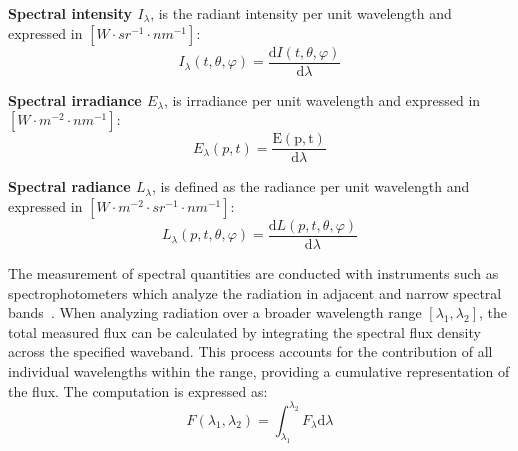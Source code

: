 \textbf{Spectral intensity $I_\lambda$}, is the radiant intensity per unit wavelength and expressed in $[W \cdot {sr}^{-1} \cdot {nm}^{-1}]$:
\begin{equation}
    I_\lambda(t, \theta, \varphi)  =  \frac{\mathrm{d}I(t, \theta, \varphi)}{\mathrm{d}\lambda}
\end{equation}

\textbf{Spectral irradiance $E_\lambda$}, is irradiance per unit wavelength and expressed in $[W \cdot m^{-2} \cdot {nm}^{-1}]$:
\begin{equation}
    E_\lambda(p, t) = \frac{\mathrm{E(p, t)}}{\mathrm{d}\lambda}
\end{equation}

\textbf{Spectral radiance $L_\lambda$}, is defined as the radiance per unit wavelength and expressed in $[W \cdot m^{-2} \cdot {sr}^{-1} \cdot {nm}^{-1}]$:
\begin{equation}
    L_\lambda(p, t, \theta, \varphi) = \frac{\mathrm{d}L(p, t, \theta, \varphi)}{\mathrm{d}\lambda}
\end{equation}

The measurement of spectral quantities are conducted with instruments such as spectrophotometers which analyze the radiation in adjacent and narrow spectral bands~\cite{2022_Hebert}.
When analyzing radiation over a broader wavelength range $[\lambda_1, \lambda_2]$, the total measured flux can be calculated by integrating the spectral flux density across the specified waveband.
This process accounts for the contribution of all individual wavelengths within the range, providing a cumulative representation of the flux.
The computation is expressed as:
\begin{equation}
    F(\lambda_1, \lambda_2) = \int_{\lambda_1}^{\lambda_2} F_\lambda \mathrm{d}\lambda
\end{equation}


